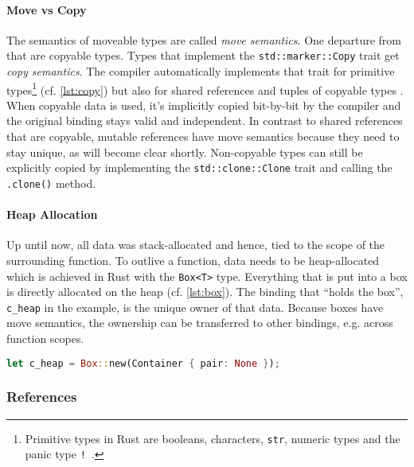 \paragraph{Move vs Copy}

The semantics of moveable types are called \emph{move semantics}. One departure
from that are copyable types. Types that implement the
\lstinline!std::marker::Copy! trait get \emph{copy semantics}. The compiler
automatically implements that trait for primitive types\footnote{Primitive types
in Rust are booleans, characters, \lstinline!str!, numeric types and the panic
type \texttt{!}~\cite{rustref}.} (cf. \autoref{lst:copy}) but also for shared
references and tuples of copyable types \cite[section "Special types and
traits"]{rustref}. When copyable data is used, it's implicitly copied bit-by-bit
by the compiler and the original binding stays valid and independent. In
contrast to shared references that are copyable, mutable references have move
semantics because they need to stay unique, as will become clear shortly.
Non-copyable types can still be explicitly copied by implementing the
\lstinline!std::clone::Clone! trait and calling the \lstinline!.clone()! method.

\paragraph{Heap Allocation}

Up until now, all data was stack-allocated and hence, tied to the scope of the
surrounding function. To outlive a function, data needs to be heap-allocated
which is achieved in Rust with the \lstinline!Box<T>! type. Everything that is
put into a box is directly allocated on the heap (cf. \autoref{lst:box}). The
binding that ``holds the box'', \lstinline!c_heap! in the example, is the unique
owner of that data. Because boxes have move semantics, the ownership can be
transferred to other bindings, e.g. across function scopes.

\begin{lstlisting}[language=Rust, label=lst:box, caption={A heap-allocated container.}, style=short]
let c_heap = Box::new(Container { pair: None });
\end{lstlisting}

\subsubsection{References}
\label{references}

